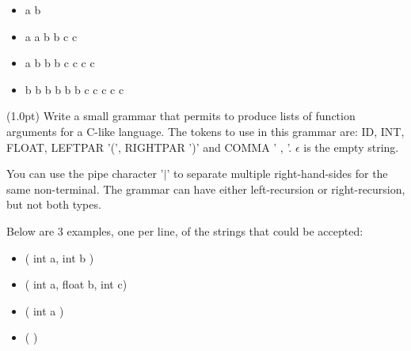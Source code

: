 \begin{itemize}
\item
a b
\item
a a b b c c
\item
a b b b c c c c
\item
b b b b b b c c c c c
\end{itemize}

\vspace{1in}


\noindent
(1.0pt) 
Write a small grammar that permits to produce lists of function arguments for a C-like language.  
The tokens to use in this grammar are: ID, INT, FLOAT, LEFTPAR '(', RIGHTPAR ')' and COMMA ' , '. $\epsilon$ is the empty string.

\noindent
You can use the pipe character '$|$' to separate multiple right-hand-sides for the same non-terminal.
The grammar can have either left-recursion or right-recursion, but not both types.

Below are 3 examples, one per line, of the strings that could  be accepted:

\begin{itemize}
\item
( int a, int b )

\item
( int a, float b, int c)

\item
( int a )

\item
( )
\end{itemize}

\vspace{2in}
